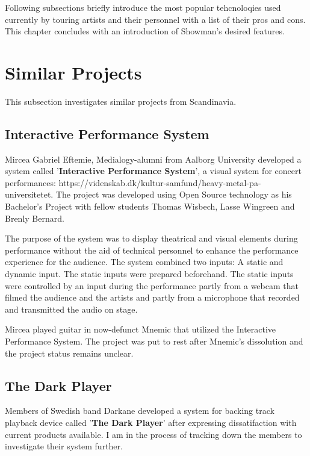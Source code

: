 Following subsections briefly introduce the most popular tehcnoloqies used currently by touring artists and their personnel with a list of their pros and cons. This chapter concludes with an introduction of Showman's desired features. \\

\section{Similar Projects}
This subsection investigates similar projects from Scandinavia. \\

\subsection{Interactive Performance System}
Mircea Gabriel Eftemie, Medialogy-alumni from Aalborg University developed a system called '\textbf{Interactive Performance System}', a visual system for concert performances: https://videnskab.dk/kultur-samfund/heavy-metal-pa-universitetet. The project was developed using Open Source technology as his Bachelor's Project with fellow students Thomas Wisbech, Lasse Wingreen and Brenly Bernard. \newline

The purpose of the system was to display theatrical and visual elements during performance without the aid of technical personnel to enhance the performance experience for the audience. The system combined two inputs: A static and dynamic input. The static inputs were prepared beforehand. The static inputs were controlled by an input during the performance partly from a webcam that filmed the audience and the artists and partly from a microphone that recorded and transmitted the audio on stage. \newline

Mircea played guitar in now-defunct Mnemic that utilized the Interactive Performance System. The project was put to rest after Mnemic's dissolution and the project status remains unclear. \\

\subsection{The Dark Player}
Members of Swedish band Darkane developed a system for backing track playback device called '\textbf{The Dark Player}' after expressing dissatifaction with current products available. I am in the process of tracking down the members to investigate their system further. \\

